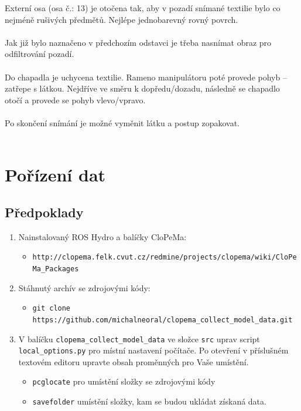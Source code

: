 \documentclass[10pt,a4paper,titlepage,oneside]{report}
\begin{document}
Externí osa (osa č.: 13) je otočena tak, aby v pozadí snímané textilie bylo co nejméně rušivých předmětů. Nejlépe jednobarevný rovný povrch.
\\
\\
Jak již bylo naznačeno v předchozím odstavci je třeba nasnímat obraz pro odfiltrování pozadí.\\
\\
Do chapadla je uchycena textilie. Rameno manipulátoru poté provede pohyb – zatřepe s látkou. Nejdříve ve směru k dopředu/dozadu, následně se chapadlo otočí a provede se pohyb vlevo/vpravo.\\
\\
Po skončení snímání je možné vyměnit látku a postup zopakovat.\\
\\


\chapter{Pořízení dat}

\section{Předpoklady}

\begin{enumerate}

   \item Nainstalovaný ROS Hydro a balíčky CloPeMa:
  \begin{itemize} 
  
  	\item \verb|http://clopema.felk.cvut.cz/redmine/projects/clopema/wiki/CloPeMa_Packages|
  \end{itemize}
  
  \item Stáhnutý archív se zdrojovými kódy:
  \begin{itemize}
  	\item \verb|git clone https://github.com/michalneoral/clopema_collect_model_data.git|
  \end{itemize}
  
  \item V balíčku \verb|clopema_collect_model_data| ve složce \verb|src| uprav script \verb|local_options.py| pro místní nastavení počítače. Po otevření v příslušném textovém editoru upravte obsah proměnných pro Vaše umístění. 
  \begin{itemize}
  	\item \verb|pcglocate| pro umístění složky se zdrojovými kódy
  	\item \verb|savefolder| umístění složky, kam se budou ukládat získaná data.
  \end{itemize}
\end{enumerate}
\end{document}
